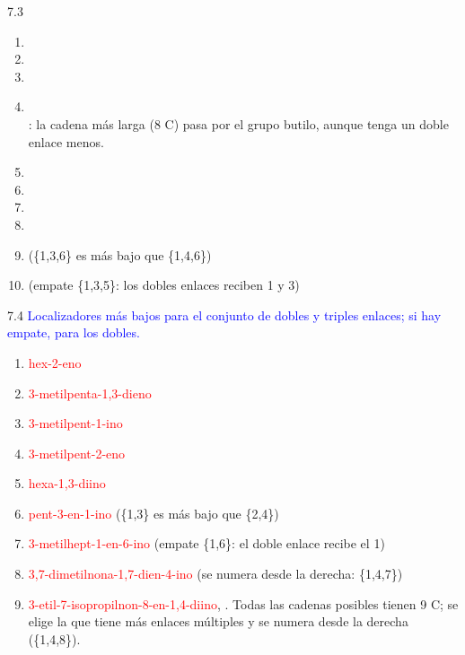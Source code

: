 \begin{Solution}{7.3}
        \begin{enumerate}[label=\alph*)]
            \item {}
            \item {}
            \item {}
            \item {}\\
                  : la cadena más larga (8 C) pasa por el grupo butilo, aunque tenga un doble enlace menos.
            \item {}
            \item {}
            \item {}
            \item {}
            \item {} \quad (\{1,3,6\} es más bajo que \{1,4,6\})
            \item {} \quad (empate \{1,3,5\}: los dobles enlaces reciben 1 y 3)
        \end{enumerate}
    
\end{Solution}
\begin{Solution}{7.4}
        \textcolor{blue}{Localizadores más bajos para el conjunto de dobles y triples enlaces; si hay empate, para los dobles.}
        \begin{enumerate}[label=\alph*)]
            \item \textcolor{red}{hex-2-eno}
            \item \textcolor{red}{3-metilpenta-1,3-dieno}
            \item \textcolor{red}{3-metilpent-1-ino}
            \item \textcolor{red}{3-metilpent-2-eno}
            \item \textcolor{red}{hexa-1,3-diino}
            \item \textcolor{red}{pent-3-en-1-ino} (\{1,3\} es más bajo que \{2,4\})
            \item \textcolor{red}{3-metilhept-1-en-6-ino} (empate \{1,6\}: el doble enlace recibe el 1)
            \item \textcolor{red}{3,7-dimetilnona-1,7-dien-4-ino} (se numera desde la derecha: \{1,4,7\})
            \item \textcolor{red}{3-etil-7-isopropilnon-8-en-1,4-diino}, . Todas las cadenas posibles tienen 9 C; se elige la que tiene más enlaces múltiples y se numera desde la derecha (\{1,4,8\}).
        \end{enumerate}
    
\end{Solution}
